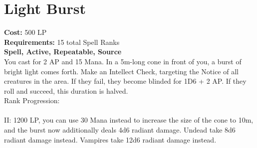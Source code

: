 \section{Light Burst}\label{spell:lightBurst}
\textbf{Cost:} 500 LP\\
\textbf{Requirements:} 15 total Spell Ranks\\
\textbf{Spell, Active, Repeatable, Source}\\
You cast for 2 AP and 15 Mana.
In a 5m-long cone in front of you, a burst of bright light comes forth.
Make an Intellect Check, targeting the Notice of all creatures in the area.
If they fail, they become blinded for 1D6 + 2 AP.
If they roll and succeed, this duration is halved.
\\
Rank Progression:\\
\\
II: 1200 LP, you can use 30 Mana instead to increase the size of the cone to 10m, and the burst now additionally deals 4d6 radiant damage.
Undead take 8d6 radiant damage instead.
Vampires take 12d6 radiant damage instead.